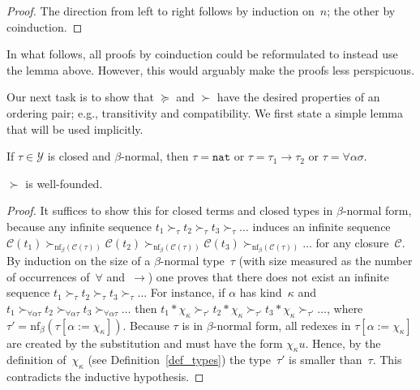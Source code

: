 \documentclass[a4paper,UKenglish,cleveref,autoref,numberwithinsect]{lipics-v2019}
\theoremstyle{definition}
\newcommand{\ITypes}{\mathcal{Y}}
\newcommand{\arrtype}{\rightarrow}
\newcommand{\tapp}[2]{#1 * #2}
\newcommand{\subst}[2]{#1:=#2}
\newcommand{\nat}{\mathtt{nat}}
\newcommand{\cl}{\mathcal{C}}
\newcommand{\nf}{\mathrm{nf}}
\begin{document}
\begin{proof}
  The direction from left to right follows by induction on~$n$; the
  other by coinduction.
\end{proof}

In what follows, all proofs by coinduction could be reformulated to
instead use the %
lemma above. However, this would arguably make the proofs
less perspicuous.

Our next task is to show that $\succeq$ and $\succ$ have the
desired properties of an ordering pair; e.g., transitivity and
compatibility. We first state a simple lemma that will be used
implicitly.

\begin{lemma}
  If $\tau \in \ITypes$ is closed and $\beta$-normal, then
  $\tau = \nat$ or $\tau = \tau_1\arrtype\tau_2$ or
  $\tau = \forall\alpha\sigma$.
\end{lemma}


\begin{lemma}\label{lem_well_founded}
  $\succ$ is well-founded.
\end{lemma}

\begin{proof}
  It suffices to show this for closed terms and closed types in
  $\beta$-normal form, because any infinite sequence $t_1 \succ_\tau
  t_2 \succ_\tau t_3 \succ_\tau \ldots$ induces an infinite sequence
  $\cl(t_1) \succ_{\nf_\beta(\cl(\tau))} \cl(t_2)
  \succ_{\nf_\beta(\cl(\tau))} \cl(t_3) \succ_{\nf_\beta(\cl(\tau))}
  \ldots$ for any closure~$\cl$. By induction on the size of a
  $\beta$-normal type~$\tau$ (with size measured as the number of
  occurrences of~$\forall$ and~$\arrtype$) one proves that there does
  not exist an infinite sequence $t_1 \succ_\tau t_2 \succ_\tau t_3
  \succ_\tau \ldots$ For instance, if $\alpha$ has kind~$\kappa$ and
  $t_1 \succ_{\forall\alpha\tau} t_2 \succ_{\forall\alpha\tau} t_3
  \succ_{\forall\alpha\tau} \ldots$ then $\tapp{t_1}{\chi_\kappa}
  \succ_{\tau'} \tapp{t_2}{\chi_\kappa} \succ_{\tau'}
  \tapp{t_3}{\chi_\kappa} \succ_{\tau'} \ldots$, where
  $\tau'=\nf_\beta(\tau[\subst{\alpha}{\chi_\kappa}])$. Because $\tau$
  is in $\beta$-normal form, all redexes in
  $\tau[\subst{\alpha}{\chi_\kappa}]$ are created by the substitution
  and must have the form $\chi_\kappa u$. Hence, by the definition
  of~$\chi_\kappa$ (see Definition~\ref{def_types}) the
  type~$\tau'$ is smaller than~$\tau$. This
  contradicts the inductive hypothesis.
\end{proof}
\end{document}
